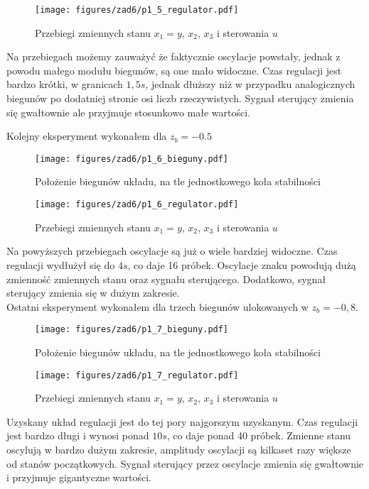 \documentclass[a4paper,titlepage,11pt,floatssmall]{mwrep}
\begin{document}
\begin{figure}[H]
\centering
\texttt{[image: figures/zad6/p1\_5\_regulator.pdf]}
\caption{Przebiegi zmiennych stanu $x_1 = y$, $x_2$, $x_3$ i sterowania $u$}
\end{figure}
\newpage

Na przebiegach możemy zauważyć że faktycznie oscylacje powstały, jednak z powodu małego modułu biegunów, są one mało widoczne. Czas regulacji jest bardzo krótki, w granicach $1,5s$, jednak dłuższy niż w przypadku analogicznych biegunów po dodatniej stronie osi liczb rzeczywistych. Sygnał sterujący zmienia się gwałtownie ale przyjmuje stosunkowo małe wartości. 

\indent Kolejny eksperyment wykonałem dla $z_b = -0.5$
\begin{figure}[H]
\centering
\texttt{[image: figures/zad6/p1\_6\_bieguny.pdf]}
\caption{Położenie biegunów układu, na tle jednostkowego koła stabilności}
\end{figure} 

\begin{figure}[H]
\centering
\texttt{[image: figures/zad6/p1\_6\_regulator.pdf]}
\caption{Przebiegi zmiennych stanu $x_1 = y$, $x_2$, $x_3$ i sterowania $u$}
\end{figure}
\newpage

Na powyższych przebiegach oscylacje są już o wiele bardziej  widoczne. Czas regulacji wydłużył się do $4s$, co daje 16 próbek. Oscylacje znaku powodują dużą zmienność zmiennych stanu oraz sygnału sterującego. Dodatkowo, sygnał sterujący zmienia się w dużym zakresie.\\
\indent Ostatni eksperyment wykonałem dla trzech biegunów ulokowanych w $z_b = -0,8$.
\begin{figure}[H]
\centering
\texttt{[image: figures/zad6/p1\_7\_bieguny.pdf]}
\caption{Położenie biegunów układu, na tle jednostkowego koła stabilności}
\end{figure} 

\begin{figure}[H]
\centering
\texttt{[image: figures/zad6/p1\_7\_regulator.pdf]}
\caption{Przebiegi zmiennych stanu $x_1 = y$, $x_2$, $x_3$ i sterowania $u$}
\end{figure}
\newpage

Uzyskany układ regulacji jest do tej pory najgorszym uzyskanym. Czas regulacji jest bardzo długi i wynosi ponad $10s$, co daje ponad 40 próbek. Zmienne stanu oscylują w bardzo dużym zakresie, amplitudy oscylacji są kilkaset razy większe od stanów początkowych. Sygnał sterujący przez oscylacje zmienia się gwałtownie i przyjmuje gigantyczne wartości. 
\end{document}
